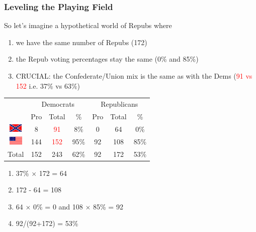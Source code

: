 \documentclass[slides]{beamer}\usepackage[]{graphicx}\usepackage[]{color}
\newcommand{\blue}[1]{\textcolor{blue2}{#1}}
\begin{document}
\begin{frame}
\frametitle{Leveling the Playing Field}
\begin{small}
So let's imagine a hypothetical world of Repubs where
\begin{enumerate}
\item we have the same number of Repubs (172)
\item the Repub voting percentages stay the same (0\% and 85\%)
\item CRUCIAL: the Confederate/Union mix is the same as with the Dems (\textcolor{red}{91 vs 152} i.e. 37\% vs 63\%) 
\end{enumerate}
\end{small}


\begin{center}
	\begin{tabular}{c|ccc|ccc}
     & \multicolumn{3}{c|}{Democrats}  & \multicolumn{3}{c}{Republicans} \\ 
     & Pro & Total & \% & Pro & Total & \% \\ 
     \hline
     \includegraphics[height=0.4cm]{conf} & 8 & \textcolor{red}{91} & \blue{8\%} & 0 & 64 & 0\% \\ 
	 \includegraphics[height=0.4cm]{union} & 144 & \textcolor{red}{152} & \blue{95\%} & 92 & 108 & 85\% \\ 
    \hline
     Total & 152 & 243 & \blue{62\%} & 92 & 172 & 53\% \\ 
  \end{tabular}
\end{center}

\begin{enumerate}
\item 37\% $\times$ 172 = 64
\item 172 - 64 = 108
\item 64 $\times$ 0\% = 0 and 108 $\times$ 85\% = 92
\item 92/(92+172) = 53\%
\end{enumerate}

\end{frame}
\end{document}
